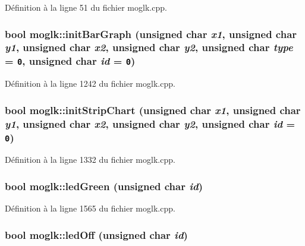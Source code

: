 Définition à la ligne 51 du fichier moglk.cpp.\hypertarget{classmoglk_cf20f143dc45f7cffd9cde3de54ea8aa}{
\subsubsection[{initBarGraph}]{\setlength{\rightskip}{0pt plus 5cm}bool moglk::initBarGraph (unsigned char {\em x1}, \/  unsigned char {\em y1}, \/  unsigned char {\em x2}, \/  unsigned char {\em y2}, \/  unsigned char {\em type} = {\tt 0}, \/  unsigned char {\em id} = {\tt 0})}}
\label{classmoglk_cf20f143dc45f7cffd9cde3de54ea8aa}




Définition à la ligne 1242 du fichier moglk.cpp.\hypertarget{classmoglk_34c40a476ff9cfd4342c0990dc3fd827}{
\subsubsection[{initStripChart}]{\setlength{\rightskip}{0pt plus 5cm}bool moglk::initStripChart (unsigned char {\em x1}, \/  unsigned char {\em y1}, \/  unsigned char {\em x2}, \/  unsigned char {\em y2}, \/  unsigned char {\em id} = {\tt 0})}}
\label{classmoglk_34c40a476ff9cfd4342c0990dc3fd827}




Définition à la ligne 1332 du fichier moglk.cpp.\hypertarget{classmoglk_355677082e83cae9f360be695a4ad5bf}{
\subsubsection[{ledGreen}]{\setlength{\rightskip}{0pt plus 5cm}bool moglk::ledGreen (unsigned char {\em id})}}
\label{classmoglk_355677082e83cae9f360be695a4ad5bf}




Définition à la ligne 1565 du fichier moglk.cpp.\hypertarget{classmoglk_f04915ee646e076725185334596ac586}{
\subsubsection[{ledOff}]{\setlength{\rightskip}{0pt plus 5cm}bool moglk::ledOff (unsigned char {\em id})}}
\label{classmoglk_f04915ee646e076725185334596ac586}




